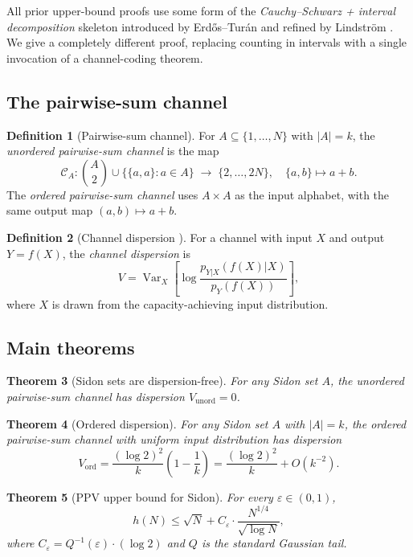 \documentclass[11pt]{amsart}
\theoremstyle{plain}
\newtheorem{theorem}{Theorem}[section]
\theoremstyle{definition}
\newtheorem{definition}[theorem]{Definition}
\theoremstyle{remark}
\begin{document}
All prior upper-bound proofs use some form of the \emph{Cauchy--Schwarz +
interval decomposition} skeleton introduced by Erd\H{o}s--Tur\'an
\cite{erdos_turan_1941} and refined by Lindstr\"om \cite{lindstrom_1969}.
We give a completely different proof, replacing counting in intervals with
a single invocation of a channel-coding theorem.

\subsection{The pairwise-sum channel}

\begin{definition}[Pairwise-sum channel]\label{def:channel}
For $A \subseteq \{1,\ldots,N\}$ with $|A| = k$, the
\emph{unordered pairwise-sum channel} is the map
\[
  \mathcal{C}_A: \binom{A}{2} \cup \{\{a,a\} : a \in A\}
  \;\longrightarrow\; \{2,\ldots,2N\},
  \quad \{a,b\} \mapsto a+b.
\]
The \emph{ordered pairwise-sum channel} uses $A \times A$ as the input
alphabet, with the same output map $(a,b) \mapsto a+b$.
\end{definition}

\begin{definition}[Channel dispersion \cite{ppv_2010}]
For a channel with input $X$ and output $Y = f(X)$, the \emph{channel
dispersion} is
\[
  V = \operatorname{Var}_{X}\!\left[\log \frac{p_{Y|X}(f(X)|X)}{p_Y(f(X))}\right],
\]
where $X$ is drawn from the capacity-achieving input distribution.
\end{definition}

\subsection{Main theorems}

\begin{theorem}[Sidon sets are dispersion-free]\label{thm:zero_disp}
For any Sidon set $A$, the unordered pairwise-sum channel has dispersion
$V_{\mathrm{unord}} = 0$.
\end{theorem}

\begin{theorem}[Ordered dispersion]\label{thm:ordered_disp}
For any Sidon set $A$ with $|A| = k$, the ordered pairwise-sum channel
with uniform input distribution has dispersion
\[
  V_{\mathrm{ord}} = \frac{(\log 2)^2}{k}\left(1 - \frac{1}{k}\right)
  = \frac{(\log 2)^2}{k} + O(k^{-2}).
\]
\end{theorem}

\begin{theorem}[PPV upper bound for Sidon]\label{thm:ppv_upper}
For every $\varepsilon \in (0,1)$,
\[
  h(N) \le \sqrt{N} + C_\varepsilon \cdot \frac{N^{1/4}}{\sqrt{\log N}},
\]
where $C_\varepsilon = Q^{-1}(\varepsilon) \cdot (\log 2)$ and $Q$ is the
standard Gaussian tail.
\end{theorem}
\end{document}
